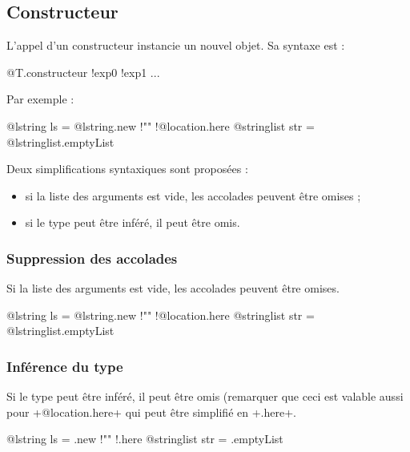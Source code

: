 








\subsection{Constructeur}

L'appel d'un constructeur instancie un nouvel objet. Sa syntaxe est :

\begin{galgasbox}
@T.constructeur {!exp0 !exp1 ...}
\end{galgasbox}

Par exemple :
\begin{galgas}
@lstring ls = @lstring.new {!"" !@location.here{}}
@stringlist str = @lstringlist.emptyList {}
\end{galgas}

Deux simplifications syntaxiques sont proposées :
\begin{itemize}
  \item si la liste des arguments est vide, les accolades peuvent être omises ;
  \item si le type peut être inféré, il peut être omis.
\end{itemize}


\subsubsection{Suppression des accolades}

Si la liste des arguments est vide, les accolades peuvent être omises.

\begin{galgas}
@lstring ls = @lstring.new {!"" !@location.here}
@stringlist str = @lstringlist.emptyList
\end{galgas}



\subsubsection{Inférence du type}

Si le type peut être inféré, il peut être omis (remarquer que ceci est valable aussi pour \ggs+@location.here+ qui peut être simplifié en \ggs+.here+.

\begin{galgas}
@lstring ls = .new {!"" !.here}
@stringlist str = .emptyList
\end{galgas}









